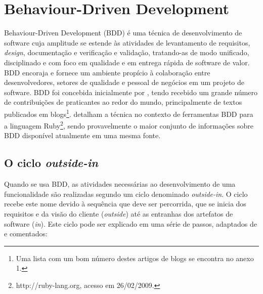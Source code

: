 \documentclass[a4paper,abntfigtabnum,noindentfirst]{abnt}
\begin{document}
\chapter{Behaviour-Driven Development}

Behaviour-Driven Development (BDD) é uma técnica de desenvolvimento de software cuja amplitude se estende às atividades de levantamento de requisitos, \textit{design}, documentação e verificação e validação, tratando-as de modo unificado, disciplinado e com foco em qualidade e em entrega rápida de software de valor. BDD encoraja e fornece um ambiente propício à colaboração entre desenvolvedores, setores de qualidade e pessoal de negócios em um projeto de software. BDD foi concebida inicialmente por , tendo recebido um grande número de contribuições de praticantes ao redor do mundo, principalmente de textos publicados em blogs\footnote{Uma lista com um bom número destes artigos de blogs se encontra no anexo 1.}.  detalham a técnica no contexto de ferramentas BDD para a linguagem Ruby\footnote{http://ruby-lang.org, acesso em 26/02/2009.}, sendo provavelmente o maior conjunto de informações sobre BDD disponível atualmente em uma mesma fonte.

\section{O ciclo \textit{outside-in}}

Quando se usa BDD, as atividades necessárias ao desenvolvimento de uma funcionalidade são realizadas segundo  um ciclo denominado \textit{outside-in}. O ciclo recebe este nome devido à sequência que deve ser percorrida, que se inicia dos requisitos e da visão do cliente (\textit{outside}) até as entranhas dos artefatos de software (\textit{in}). Este ciclo pode ser explicado em uma série de passos, adaptados de  e comentados:
\end{document}
